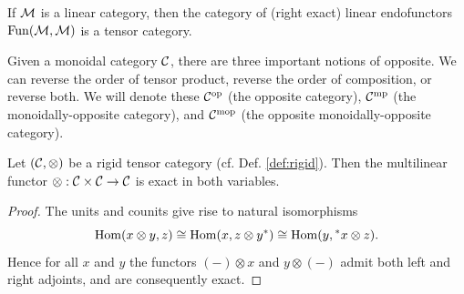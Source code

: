 \documentclass{amsart}
\begin{document}
\begin{example}
	If $\mathcal M$ is a linear category, then the category of (right exact) linear endofunctors $\operatorname{Fun}(\mathcal M, \mathcal M)$ is a tensor category. 
\end{example}

Given a monoidal category $\mathcal C$, there are three important notions of opposite. We can reverse the order of tensor product, reverse the order of composition, or reverse both.  We will denote these $\mathcal C^{\mathrm{op}}$ (the opposite category), $\mathcal C^{\mathrm{mp}}$ (the monoidally-opposite category), and $\mathcal C^{\mathrm{mop}}$ (the opposite monoidally-opposite category).


%
%



\begin{lemma} \label{lma:RigidIsExact}
	Let $(\mathcal C, \otimes)$ be a rigid tensor category (cf. Def. \ref{def:rigid}). Then the multilinear functor $\otimes: \mathcal C \times \mathcal C \to \mathcal C$ is exact in both variables. 
\end{lemma}

\begin{proof}
	The units and counits give rise to natural isomorphisms %
 \begin{equation*} 
 	\operatorname{Hom}(x \otimes y, z) \cong \operatorname{Hom}( x, z \otimes y^*) \cong \operatorname{Hom}(y, {}^*x \otimes z).
 \end{equation*}
	Hence for all $x$ and $y$ the functors $(-)\otimes x$ and $y \otimes (-)$ admit both left and right adjoints, and are consequently exact. 
\end{proof}
\end{document}
